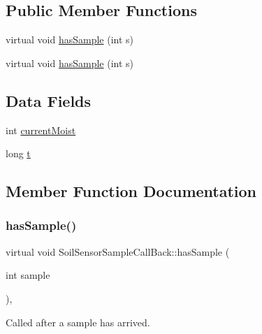 \subsection*{Public Member Functions}
\begin{DoxyCompactItemize}
\item 
virtual void \hyperlink{classSoilSensorSampleCallBack_a6bacdcc40b01f6a427f0f9ef2210fa76}{has\+Sample} (int s)
\item 
virtual void \hyperlink{classSoilSensorSampleCallBack_a6bacdcc40b01f6a427f0f9ef2210fa76}{has\+Sample} (int s)
\end{DoxyCompactItemize}
\subsection*{Data Fields}
\begin{DoxyCompactItemize}
\item 
int \hyperlink{classSoilSensorSampleCallBack_a0f82c27a02ffa86512ff83f92a4a6e93}{current\+Moist}
\item 
long \hyperlink{classSoilSensorSampleCallBack_a27c6796e420396b73a1c05019a613c31}{t}
\end{DoxyCompactItemize}


\subsection{Member Function Documentation}
\mbox{\label{classSoilSensorSampleCallBack_a6bacdcc40b01f6a427f0f9ef2210fa76}} 
\subsubsection{\texorpdfstring{has\+Sample()}{hasSample()}\hspace{0.1cm}{\footnotesize\ttfamily [1/2]}}
{\footnotesize\ttfamily virtual void Soil\+Sensor\+Sample\+Call\+Back\+::has\+Sample (\begin{DoxyParamCaption}\item[{int}]{sample }\end{DoxyParamCaption})\hspace{0.3cm}{\ttfamily [inline]}, {\ttfamily [virtual]}}

Called after a sample has arrived. 

